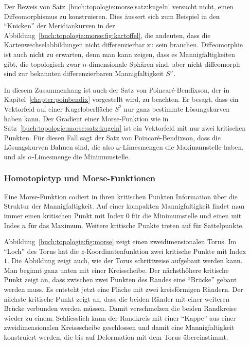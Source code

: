 Der Beweis von Satz~\ref{buch:topologie:morse:satz:kugeln} versucht
nicht, einen Diffeomorphismus zu konstruieren.
Dies äussert sich zum Beispiel in den ``Knicken'' der Meridiankurven
in der Abbildung~\ref{buch:topologie:morse:fig:kartoffel}, die andeuten,
dass die Kartenwechselabbildungen nicht differenzierbar zu sein brauchen.
Diffeomorphie ist auch nicht zu erwarten, denn man kann zeigen, dass es
Mannigfaltigkeiten gibt, die topologisch zwar $n$-dimensionale
Sphären sind, aber nicht diffeomorph sind zur bekannten differenzierbaren
Mannigfaltigkeit $S^n$.

In diesem Zusammenhang ist auch der Satz von Poincaré-Bendixson,
der in Kapitel~\ref{chapter:poinbendix} vorgestellt wird, zu beachten.
Er besagt, dass ein Vektorfeld auf einer Kugeloberfläche $S^2$ nur
ganz bestimmte Lösungskurven haben kann.
Der Gradient einer Morse-Funktion wie in
Satz~\ref{buch:topologie:morse:satz:kugeln}
ist ein Vektorfeld mit nur zwei kritischen Punkten.
Für diesen Fall sagt der Satz von Poincaré-Bendixson, dass die
%
Lösungskurven Bahnen sind, die also $\omega$-Limesmengen die 
%
%
Maximumstelle haben, und als $\alpha$-Limesmenge die Minimumstelle.

%
%
\subsubsection{Homotopietyp und Morse-Funktionen}
Eine Morse-Funktion codiert in ihren kritischen Punkten Information
über die Struktur der Mannigfaltigkeit.
Auf einer kompakten Mannigfaltigkeit findet man immer einen kritischen
Punkt mit Index $0$ für die Minimumstelle und einen mit Indes $n$ für
das Maximum.
%
Weitere kritische Punkte treten auf für Sattelpunkte.

Abbildung~\ref{buch:topologie:fig:morse} zeigt einen zweidimensionalen
Torus.
Im ``Loch'' des Torus hat die $z$-Koordinatenfunktion zwei kritische Punkte
mit Index $1$.
Die Abbildung zeigt auch, wie der Torus schrittweise aufgebaut werden
kann.
Man beginnt ganz unten mit einer Kreisscheibe.
Der nächsthöhere kritische Punkt zeigt an, dass zwischen zwei Punkten
des Randes eine ``Brücke'' gebaut werden muss.
Es entsteht jetzt eine Fläche mit zwei kreisförmigen Rändern.
Der nächste kritische Punkt zeigt an, dass die beiden Ränder mit
einer weiteren Brücke verbunden werden müssen.
Damit verschmelzen die beiden Randkreise wieder zu einem.
Schliesslich kann der Randkreis mit einer ``Kappe'' aus einer
zweidimensionalen Kreissscheibe geschlossen und damit eine
Mannigfaltigkeit konstruiert werden, die bis auf Deformation mit dem
Torus übereinstimmt.

